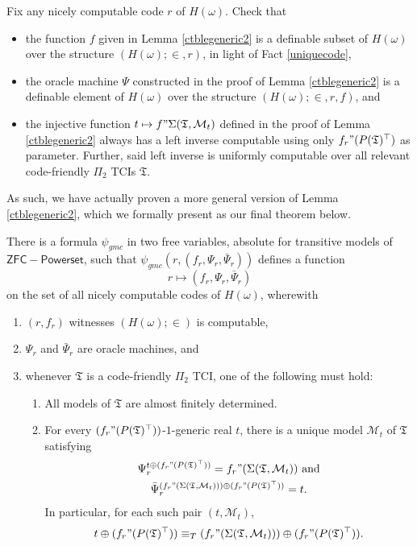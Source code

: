 \documentclass[12pt]{article}
\numberwithin{equation}{section}
\begin{document}
Fix any nicely computable code $r$ of $H(\omega)$. Check that
\begin{itemize}
    \item the function $f$ given in Lemma \ref{ctblegeneric2} is a definable subset of $H(\omega)$ over the structure $(H(\omega); \in, r)$, in light of Fact \ref{uniquecode},
    \item the oracle machine $\Psi$ constructed in the proof of Lemma \ref{ctblegeneric2} is a definable element of $H(\omega)$ over the structure $(H(\omega); \in, r, f)$, and
    \item the injective function $t \mapsto f" \Sigma(\mathfrak{T}, \mathcal{M}_t)$ defined in the proof of Lemma \ref{ctblegeneric2} always has a left inverse computable using only $f_r" (P(\mathfrak{T})^{\top})$ as parameter. Further, said left inverse is uniformly computable over all relevant code-friendly $\Pi_2$ TCIs $\mathfrak{T}$.
\end{itemize}
As such, we have actually proven a more general version of Lemma \ref{ctblegeneric2}, which we formally present as our final theorem below.

\begin{thm}\label{lastthm}
There is a formula $\psi_{gmc}$ in two free variables, absolute for transitive models of $\mathsf{ZFC - Powerset}$, such that $\psi_{gmc}(r, (f_r, \Psi_r, \bar{\Psi}_{r}))$ defines a function $$r \mapsto (f_r, \Psi_r, \bar{\Psi}_{r})$$ on the set of all nicely computable codes of $H(\omega)$, wherewith
\begin{enumerate}[label=(\arabic*)]
    \item $(r, f_r)$ witnesses $(H(\omega); \in)$ is computable,
    \item $\Psi_r$ and $\bar{\Psi}_{r}$ are oracle machines, and
    \item whenever $\mathfrak{T}$ is a code-friendly $\Pi_2$ TCI, one of the following must hold:
    \begin{enumerate}[label=(\alph*)]
        \item All models of $\mathfrak{T}$ are almost finitely determined.
        \item For every $(f_r" (P(\mathfrak{T})^{\top}))$-$1$-generic real $t$, there is a unique model $\mathcal{M}_t$ of $\mathfrak{T}$ satisfying 
        \begin{gather*}
            \Psi_r^{t \oplus (f_r" (P(\mathfrak{T})^{\top}))} = f_r" (\Sigma(\mathfrak{T}, \mathcal{M}_t)) \text{ and} \\
            \bar{\Psi}_{r}^{(f_r" (\Sigma(\mathfrak{T}, \mathcal{M}_t))) \oplus (f_r" (P(\mathfrak{T})^{\top}))} = t.
        \end{gather*}
        In particular, for each such pair $(t, \mathcal{M}_t)$, $$t \oplus (f_r" (P(\mathfrak{T})^{\top})) \equiv_{T} (f_r" (\Sigma(\mathfrak{T}, \mathcal{M}_t))) \oplus (f_r" (P(\mathfrak{T})^{\top})).$$
\end{enumerate}
\end{enumerate}
\end{thm}
\end{document}
